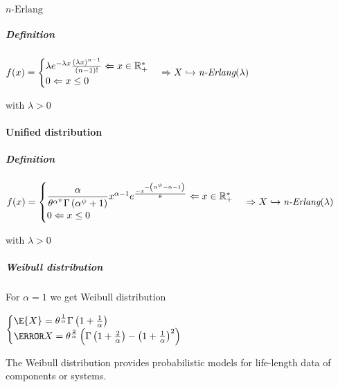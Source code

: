 \paragraph{$n\text{-Erlang}$}
\subparagraph{Definition}
\begin{center}
	$f(x)=
	\begin{cases}
		\lambda e^{-\lambda x}\frac{(\lambda x)^{n-1}}{(n-1)!}\Leftarrow x\in\mathbb{R}_{+}^{*}\\
		0\Leftarrow x\leq 0
	\end{cases} \Rightarrow X\hookrightarrow \emph{n-Erlang}(\lambda)$
\end{center}
with $\lambda > 0$
\paragraph{Unified distribution}
\subparagraph{Definition}
\begin{center}
	$f(x)=
	\begin{cases}
		\dfrac{\alpha}{\theta^{\alpha^{\psi}}\Gamma\left( \alpha^{\psi}+1\right)}x^{\alpha -1}e^{\frac{-x^{-\left( \alpha^{\psi }- \alpha -1\right)}}{\theta}}\Leftarrow x\in\mathbb{R}_{+}^{*}\\
		0\Leftarrow x\leq 0
	\end{cases} \Rightarrow X\hookrightarrow \emph{n-Erlang}(\lambda)$
\end{center}
with $\lambda > 0$
\subparagraph{Weibull distribution}
For $\alpha = 1$ we get Weibull distribution\\
\begin{center}
$\begin{cases}\E{X}=\theta^{\frac{1}{\alpha}}\Gamma\left(1+\frac{1}{\alpha}\right)\\
	\V{X}=\theta^{\frac{2}{\alpha}}\left(\Gamma\left(1+\frac{2}{\alpha}\right)-\left(1+\frac{1}{\alpha}\right)^{2}\right)\end{cases}$
\end{center}
The Weibull distribution provides probabilistic models for life-length data of components or systems.
